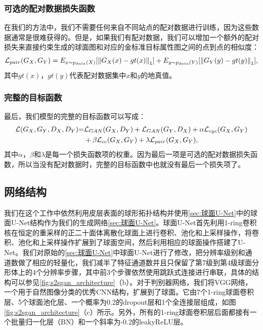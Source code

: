 \subsubsection{可选的配对数据损失函数}
在我们的方法中，我们不需要任何来自不同站点的配对数据进行训练，因为这些数据通常是很难获得的。但是，如果我们有配对数据，我们可以增加一个额外的配对损失来直接约束生成的球面图和对应的金标准目标属性图之间的点到点的相似度：
\begin{equation}
	{{\cal L}_{pair}}({G_X},{G_Y}) = {E_{x\sim{p_{data}}(X)}}[{\left\| {{G_X}(x) - gt(x)} \right\|_1}] + {E_{y\sim{p_{data}}(Y)}}[{\left\| {{G_Y}(y) - gt(y)} \right\|_1}],
\end{equation}
其中$gt(x)$，$gt(y)$代表配对数据集中$x$和$y$的地真值。
	
\subsubsection{完整的目标函数} 
最后，我们模型的完整的目标函数可以写成：
\begin{equation}
\begin{split}
    {\cal L}({G_X},{G_Y},{D_X},{D_Y}){\rm{ = }} & {{\cal L}_{GAN}}({G_X},{D_Y}) + {{\cal L}_{GAN}}({G_Y},{D_X}) + \alpha {{\cal L}_{cyc}}({G_X},{G_Y})  \\
    & +\beta {{\cal L}_{cc}}({G_X},{G_Y}) + \lambda {{\cal L}_{pair}}({G_X},{G_Y}),
\end{split}
\end{equation}
其中$\alpha$，$\beta$和$\lambda$是每一个损失函数项的权重。因为最后一项是可选的配对数据损失函数，所以当没有配对数据时，完整的目标函数中也就没有最后一个损失项了。
	
\subsection{网络结构}
我们在这个工作中依然利用皮层表面的球形拓扑结构并使用\ref{sec:球面U-Net}中的球面U-Net结构作为我们的生成网络\ref{sec:球面U-Net}。球面U-Net首先利用1-ring卷积核在恒定的重采样的正二十面体离散化球面上进行卷积、池化和上采样操作，将卷积、池化和上采样操作扩展到了球面空间，然后利用相应的球面操作搭建了U-Net。我们对原始的\ref{sec:球面U-Net}中球面U-Net进行了修改，把分辨率级别和通道数做了相应的轻量化，我们减半了特征通道数并且只保留了第7级到第4级球面分形体上的4个分辨率步骤，其中前3个步骤依然使用跳跃式连接进行串联，具体的结构可以参见\ref{fig:s2sgan_architecture}（b）。对于判别器网络，我们将VGG\cite{simonyan2014very}网络，一个用于自然图像分类的优秀CNN结构，扩展到了球面。它由7个1-ring球面卷积层、5个球面池化层、一个概率为0.2的dropout层和1个全连接层组成，如图\ref{fig:s2sgan_architecture}（c）所示。另外，所有的1-ring球面卷积层后面都接有一个批量归一化层（BN）和一个斜率为-0.2的leakyReLU层。


